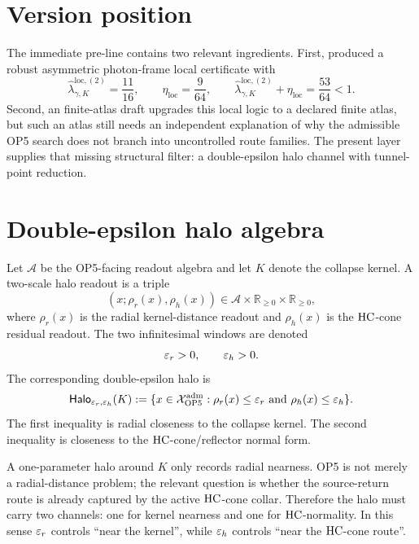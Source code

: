 \section{Version position}

The immediate pre-line contains two relevant ingredients. First, produced a robust asymmetric photon-frame local certificate with
\[
\widehat\lambda_{\gamma,K}^{\mathrm{loc},(2)}=\frac{11}{16},
\qquad
\eta_{\mathrm{loc}}=\frac{9}{64},
\qquad
\widehat\lambda_{\gamma,K}^{\mathrm{loc},(2)}+\eta_{\mathrm{loc}}=\frac{53}{64}<1.
\]
Second, an finite-atlas draft upgrades this local logic to a declared finite atlas, but such an atlas still needs an independent explanation of why the admissible OP5 search does not branch into uncontrolled route families. The present layer supplies that missing structural filter: a double-epsilon halo channel with tunnel-point reduction.

\section{Double-epsilon halo algebra}

\begin{definition}
Let \(\mathcal A\) be the OP5-facing readout algebra and let \(K\) denote the collapse kernel. A two-scale halo readout is a triple
\[
(x;\rho_r(x),\rho_h(x))\in \mathcal A\times\mathbb R_{\ge0}\times\mathbb R_{\ge0},
\]
where \(\rho_r(x)\) is the radial kernel-distance readout and \(\rho_h(x)\) is the \(\mathrm{HC}\)-cone residual readout. The two infinitesimal windows are denoted
\[
\varepsilon_r>0,
\qquad
\varepsilon_h>0.
\]
The corresponding double-epsilon halo is
\[
\mathsf{Halo}_{\varepsilon_r,\varepsilon_h}(K)
:=
\{x\in\mathcal X_{\mathrm{OP} 5}^{\mathrm{adm}}:\rho_r(x)\le\varepsilon_r\ \text{and}\ \rho_h(x)\le\varepsilon_h\}.
\]
The first inequality is radial closeness to the collapse kernel. The second inequality is closeness to the \(\mathrm{HC}\)-cone/reflector normal form.
\end{definition}

\begin{remark}
A one-parameter halo around \(K\) only records radial nearness. OP5 is not merely a radial-distance problem; the relevant question is whether the source-return route is already captured by the active \(\mathrm{HC}\)-cone collar. Therefore the halo must carry two channels: one for kernel nearness and one for \(\mathrm{HC}\)-normality. In this sense \(\varepsilon_r\) controls ``near the kernel'', while \(\varepsilon_h\) controls ``near the \(\mathrm{HC}\)-cone route''.
\end{remark}

